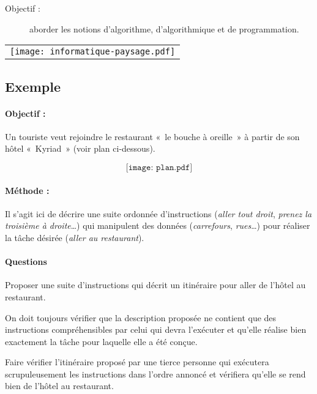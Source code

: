 \noindent\begin{minipage}{7cm}
\begin{description}
\item[Objectif :] aborder les notions d'algo\-rithme, d'algorithmique et de pro\-gram\-mation.
\end{description}
\end{minipage}
\mbox{}\hfill
\begin{tabular}{c}
\texttt{[image: informatique-paysage.pdf]}
\end{tabular}

\subsection{Exemple}\label{ex:restaurant}

\paragraph{Objectif :} 
Un touriste veut rejoindre le restaurant «~le bouche à oreille~»
à partir de son hôtel «~Kyriad~» (voir plan ci-dessous).

$$\texttt{[image: plan.pdf]}$$

\paragraph{Méthode :} 
Il s'agit ici de décrire une suite ordonnée d'instructions
(\emph{aller tout droit}, \emph{prenez la troisième à droite}\ldots)
qui manipulent des données (\emph{carrefours}, \emph{rues}\ldots)
pour réaliser la tâche désirée (\emph{aller au restaurant}).

\paragraph{Questions} 

\begin{question} 
Proposer une suite d'instructions qui décrit un itinéraire pour aller
de l'hôtel au restaurant.
\end{question}

On doit toujours vérifier que la description proposée ne contient que des instructions compréhensibles par celui qui devra l'exécuter et qu'elle réalise bien exactement la tâche pour laquelle elle a été conçue.
\begin{question}
Faire vérifier l'itinéraire proposé par une tier\-ce personne qui exécutera 
scrupuleusement les instructions dans l'ordre annoncé et vérifiera qu'elle
se rend bien de l'hôtel au restaurant. 
\end{question}

